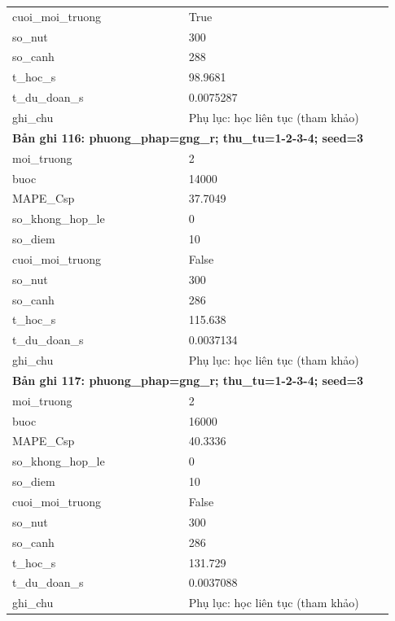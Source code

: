 \begin{longtable}{p{0.43\linewidth}p{0.50\linewidth}}
cuoi\_\allowbreak moi\_\allowbreak truong & True \\
so\_\allowbreak nut & 300 \\
so\_\allowbreak canh & 288 \\
t\_\allowbreak hoc\_\allowbreak s & 98.9681 \\
t\_\allowbreak du\_\allowbreak doan\_\allowbreak s & 0.0075287 \\
ghi\_\allowbreak chu & Phụ lục: học liên tục (tham khảo) \\
\midrule
\multicolumn{2}{p{0.95\linewidth}}{\textbf{Bản ghi 116: phuong\_phap=gng\_r; thu\_tu=1-2-3-4; seed=3}} \\
moi\_\allowbreak truong & 2 \\
buoc & 14000 \\
MAPE\_\allowbreak Csp & 37.7049 \\
so\_\allowbreak khong\_\allowbreak hop\_\allowbreak le & 0 \\
so\_\allowbreak diem & 10 \\
cuoi\_\allowbreak moi\_\allowbreak truong & False \\
so\_\allowbreak nut & 300 \\
so\_\allowbreak canh & 286 \\
t\_\allowbreak hoc\_\allowbreak s & 115.638 \\
t\_\allowbreak du\_\allowbreak doan\_\allowbreak s & 0.0037134 \\
ghi\_\allowbreak chu & Phụ lục: học liên tục (tham khảo) \\
\midrule
\multicolumn{2}{p{0.95\linewidth}}{\textbf{Bản ghi 117: phuong\_phap=gng\_r; thu\_tu=1-2-3-4; seed=3}} \\
moi\_\allowbreak truong & 2 \\
buoc & 16000 \\
MAPE\_\allowbreak Csp & 40.3336 \\
so\_\allowbreak khong\_\allowbreak hop\_\allowbreak le & 0 \\
so\_\allowbreak diem & 10 \\
cuoi\_\allowbreak moi\_\allowbreak truong & False \\
so\_\allowbreak nut & 300 \\
so\_\allowbreak canh & 286 \\
t\_\allowbreak hoc\_\allowbreak s & 131.729 \\
t\_\allowbreak du\_\allowbreak doan\_\allowbreak s & 0.0037088 \\
ghi\_\allowbreak chu & Phụ lục: học liên tục (tham khảo) \\

\end{longtable}
